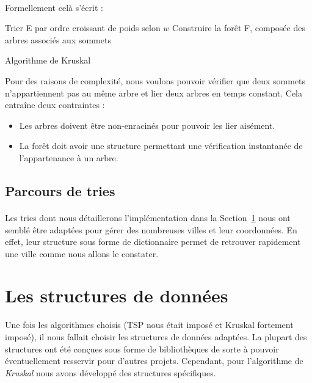 \documentclass[a4paper]{article}
\begin{document}
\paragraph*{}
Formellement celà s'écrit :

\medskip

\begin{algorithm}[H]
\SetAlgoLined
{}
Trier E par ordre croissant de poids selon $w$\;
Construire la forêt F, composée des arbres associés aux sommets\;
\caption{Algorithme de Kruskal}
\end{algorithm}

\medskip

Pour des raisons de complexité, nous voulons pouvoir vérifier que deux sommets n'appartiennent pas au même arbre et lier deux arbres en temps constant. Cela entraîne deux contraintes :
\begin{itemize}
\item Les arbres doivent être non-enracinés pour pouvoir les lier aisément.
\item La forêt doit avoir une structure permettant une vérification instantanée de l'appartenance à un arbre.
\end{itemize}

\subsection{Parcours de tries}

\paragraph*{}Les tries dont nous détaillerons l'implémentation dans la Section~\ref{se:structures} nous ont semblé être adaptées pour gérer des nombreuses villes et leur coordonnées. En effet, leur structure sous forme de dictionnaire permet de retrouver rapidement une ville comme nous allons le constater.

\section{Les structures de données}
\label{se:structures}

Une fois les algorithmes choisis (TSP nous était imposé et Kruskal fortement imposé), il nous fallait choisir les structures de données adaptées. La plupart des structures ont été conçues sous forme de bibliothèques de sorte à pouvoir éventuellement resservir pour d'autres projets. Cependant, pour l'algorithme de \emph{Kruskal} nous avons développé des structures spécifiques.
\end{document}
